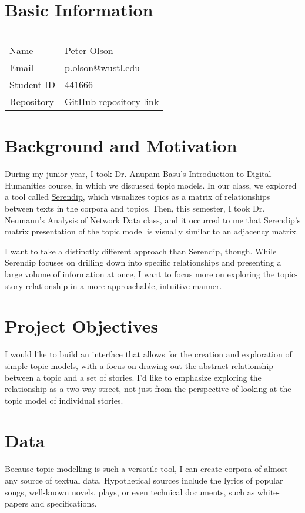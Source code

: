 



\section{Basic Information}
$\ $

\begin{tabular}{ll}
	Name & Peter Olson \\
	Email & p.olson@wustl.edu \\
	Student ID & 441666 \\
	Repository & \href{https://github.com/BackToTheDrawingBoard/cse557-fl18-information-visualization-final-project}{GitHub repository link}
\end{tabular}


\section{Background and Motivation}
During my junior year, I took Dr. Anupam Basu's Introduction to Digital
Humanities course, in which we discussed topic models.  In our class, we
explored a tool called
\href{http://vep.cs.wisc.edu/serendip/}{Serendip}, which visualizes
topics as a matrix of relationships between texts in the corpora and
topics.  Then, this semester, I took Dr. Neumann's Analysis of Network
Data class, and it occurred to me that Serendip's matrix presentation of
the topic model is visually similar to an adjacency matrix.

I want to take a distinctly different approach than Serendip, though.
While Serendip focuses on drilling down into specific relationships and
presenting a large volume of information at once, I want to focus more
on exploring the topic-story relationship in a more approachable,
intuitive manner.

\section{Project Objectives}
I would like to build an interface that allows for the creation and
exploration of simple topic models, with a focus on drawing out the
abstract relationship between a topic and a set of stories.  I'd like to
emphasize exploring the relationship as a two-way street, not just from
the perspective of looking at the topic model of individual stories.

\section{Data}
Because topic modelling is such a versatile tool, I can create corpora
of almost any source of textual data.  Hypothetical sources include the
lyrics of popular songs, well-known novels, plays, or even technical
documents, such as white-papers and specifications.

